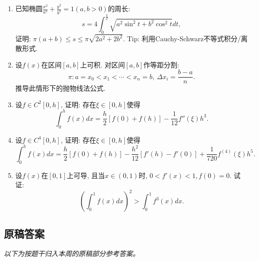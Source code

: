 \documentclass[UTF8,11pt, a4paper, oneside, fontset=none]{ctexbook}
\begin{document}
\begin{enumerate}
\item 已知椭圆$\frac{x^2}{a^2} + \frac{y^2}{b^2} =1 (a, b >0)$的周长:
\[
s = 4 \int_0^{\frac{\pi}{2}} \sqrt{a^2 \sin^2 t + b^2 \cos^2 t} dt,
\]
证明: $\pi(a+b) \leq s \leq \pi \sqrt{2a^2 + 2b^2}$. Tip: 利用Cauchy-Schwarz不等式积分/离散形式.

\item 设$f(x)$在区间$[a, b]$上可积. 对区间$[a, b]$作等距分割: 
\[
\pi: a = x_0 < x_1 < \cdots < x_n = b, \ \Delta x_i = \frac{b-a}{n}. 
\]
推导此情形下的抛物线法公式.

\item 设$f \in C^2[0, h]$, 证明: 存在$\xi \in [0, h]$使得
\[
\int_0^h f(x) dx = \frac{h}{2} [f(0) + f(h)] - \frac{1}{12} f''(\xi) h^3. 
\]

\item 设$f \in C^4[0, h]$, 证明: 存在$\xi \in [0, h]$使得
\[
\int_0^h f(x) dx = \frac{h}{2} [f(0) + f(h)] - \frac{h^2}{12} [f'(h) - f'(0)] + \frac{1}{720} f^{(4)} (\xi) h^5.
\]

\item 设$f(x)$在$[0, 1]$上可导, 且当$x \in (0, 1)$时, $0 < f'(x) < 1, f(0) = 0$. 试证:
\[
\left( \int_0^1 f(x) dx \right)^2 > \int_0^1 f^3(x) dx.
\]

\end{enumerate}

\clearpage

\subsection*{原稿答案}

\noindent\emph{以下为按题干归入本周的原稿部分参考答案。}
\end{document}
